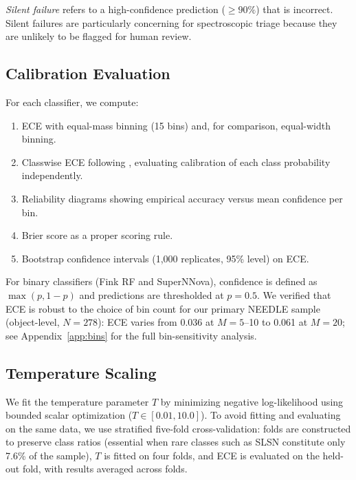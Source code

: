 \documentclass[twocolumn]{aastex631}
\begin{document}
\textit{Silent failure} refers to a high-confidence prediction
($\geq 90\%$) that is incorrect. Silent failures are particularly
concerning for spectroscopic triage because they are unlikely to be
flagged for human review.

\subsection{Calibration Evaluation}

For each classifier, we compute:
\begin{enumerate}
    \item ECE with equal-mass binning (15 bins) and, for comparison, equal-width binning.
    \item Classwise ECE following \citet{nixon2019}, evaluating calibration of each class probability independently.
    \item Reliability diagrams showing empirical accuracy versus mean confidence per bin.
    \item Brier score as a proper scoring rule.
    \item Bootstrap confidence intervals (1,000 replicates, 95\% level) on ECE.
\end{enumerate}

For binary classifiers (Fink RF and SuperNNova), confidence is defined as $\max(p, 1-p)$ and predictions are thresholded at $p = 0.5$. We verified that ECE is robust to the choice of bin count for our primary NEEDLE sample (object-level, $N = 278$): ECE varies from 0.036 at $M = 5$--10 to 0.061 at $M = 20$; see Appendix~\ref{app:bins} for the full bin-sensitivity analysis.

\subsection{Temperature Scaling}

We fit the temperature parameter $T$ by minimizing negative log-likelihood using bounded scalar optimization ($T \in [0.01, 10.0]$). To avoid fitting and evaluating on the same data, we use stratified five-fold cross-validation: folds are constructed to preserve class ratios (essential when rare classes such as SLSN constitute only 7.6\% of the sample), $T$ is fitted on four folds, and ECE is evaluated on the held-out fold, with results averaged across folds.
\end{document}

